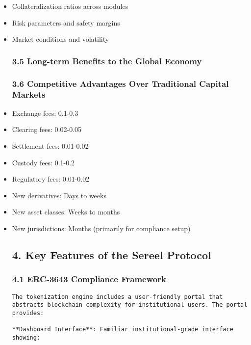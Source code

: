 \documentclass[12pt]{article}
\begin{document}
{{\begin{enumerate}
\end{enumerate}
\begin{itemize}
	\item Collateralization ratios across modules
	\item Risk parameters and safety margins
	\item Market conditions and volatility
\subsubsection{3.5 Long-term Benefits to the Global Economy} %
\subsubsection{3.6 Competitive Advantages Over Traditional Capital Markets} %
	\item Exchange fees: 0.1-0.3%
	\item Clearing fees: 0.02-0.05%
	\item Settlement fees: 0.01-0.02%
	\item Custody fees: 0.1-0.2%
	\item Regulatory fees: 0.01-0.02%
	\item New derivatives: Days to weeks
	\item New asset classes: Weeks to months
	\item New jurisdictions: Months (primarily for compliance setup)
\subsection{4. Key Features of the Sereel Protocol} %
\subsubsection{4.1 ERC-3643 Compliance Framework} %

\begin{lstlisting}
The tokenization engine includes a user-friendly portal that abstracts blockchain complexity for institutional users. The portal provides:

**Dashboard Interface**: Familiar institutional-grade interface showing:


\end{lstlisting}
\end{itemize}}}
\end{document}
